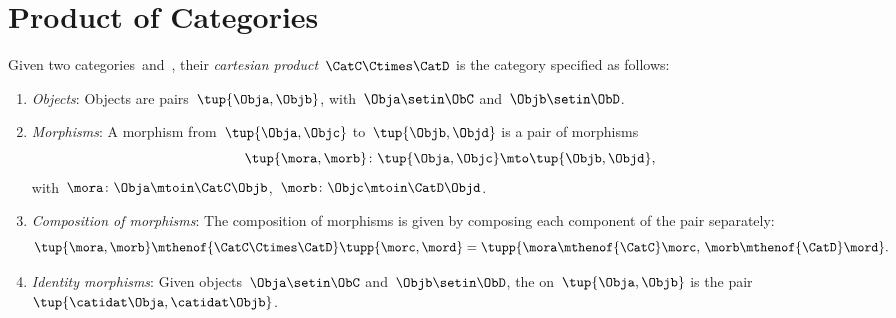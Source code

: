 
\section{Product of Categories}

\begin{ctdefinition}
    \label{def:cartesian-product-category}
    Given two categories~\CatC and~\CatD, their \emph{cartesian product}~$\CatC \Ctimes \CatD$ is the category specified as follows:
    \begin{enumerate}
        \item \emph{Objects}: Objects are pairs~$\tup{\Obja,\Objb}$, with~$\Obja\setin \ObC$ and~$\Objb\setin \ObD$.
        \item \emph{Morphisms}: A morphism from~$\tup{\Obja, \Objc}$ to~$\tup{\Objb,\Objd}$ is a pair of morphisms
              \begin{equation}\label{eq:prod-cat-morphisms}
                  \tup{\mora,\morb} \colon \tup{\Obja,\Objc}\mto \tup{\Objb,\Objd},
              \end{equation}
              with~$\mora\colon \Obja \mtoin\CatC \Objb$,~$\morb\colon \Objc\mtoin\CatD \Objd$.
                \item \emph{Composition of morphisms}: The composition of morphisms is given by composing each component of the pair separately:
              \begin{equation}
                  \tup{\mora,\morb}\mthenof{\CatC\Ctimes\CatD} \tupp{\morc,\mord}=\tupp{\mora\mthenof{\CatC}\morc,\, \morb \mthenof{\CatD} \mord}.
              \end{equation}
              \item \emph{Identity morphisms}: Given objects~$\Obja\setin \ObC$ and~$\Objb\setin \ObD$, the  on~$\tup{\Obja,\Objb}$ is the pair $\tup{\catidat\Obja,\catidat\Objb}$.
    \end{enumerate}
\end{ctdefinition}




